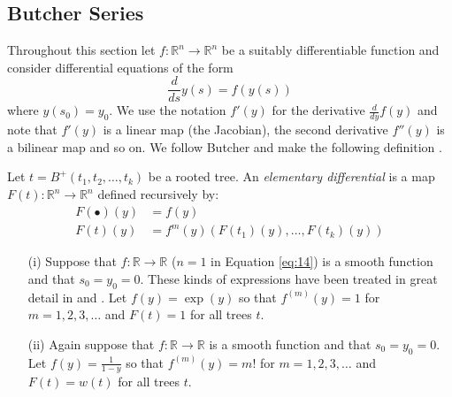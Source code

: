  \subsection{Butcher Series}
 Throughout this section let $f: \mathbb{R}^n \rightarrow \mathbb{R}^n$ be a suitably differentiable function and consider differential equations of the form 
 \begin{equation}\label{eq:14}
  \frac{d}{ds}{y(s)} = f(y(s))
 \end{equation}
where $y(s_0) = y_0$.  We use the notation $f'(y)$ for the derivative $\frac{d}{dy}f(y)$ and note that $f'(y)$ is a linear map (the Jacobian), the second derivative $f''(y)$ is a bilinear map and so on.   
We follow Butcher and make the following definition \cite{Butcher2008}.

\begin{defn}
Let $t = B^{+}(t_1,t_2,\dots,t_k)$ be  a rooted tree. An \emph{elementary differential} is a map  $F(t):  \mathbb{R}^n \rightarrow \mathbb{R}^n$ defined 
recursively by:
\begin{align}
 F(\bullet)(y) &= f(y) \\%
 F(t)(y) &= f^{m}(y)(F(t_1)(y),\dots,F(t_k)(y))
 \end{align}
\end{defn}
\begin{ex}\label{ex:bseries}
\begin{itemize}
 \item[(i)] Suppose that $f: \mathbb{R} \rightarrow \mathbb{R}$ ($n=1$ in Equation \ref{eq:14}) is a smooth function  and that 
 $s_0 = y_0 =0$.  These kinds of expressions have been treated in great detail in \cite{butcher2008} and \cite{butcher1972}. 
 Let $f(y) = \exp(y)$ so that $f^{(m)}(y) = 1$ for $m=1,2,3,\dots$ and $F(t) = 1$ for all trees $t$. 
 \item[(ii)] Again suppose that $f: \mathbb{R} \rightarrow \mathbb{R}$ is a smooth function  and that $s_0 = y_0 = 0$.  Let 
 $f(y) = \frac{1}{1-y}$ so that $f^{(m)}(y) = m!$ for $m=1,2,3,\dots$ and $F(t) = w(t)$ for all trees $t$.
\end{itemize}   
\end{ex}

